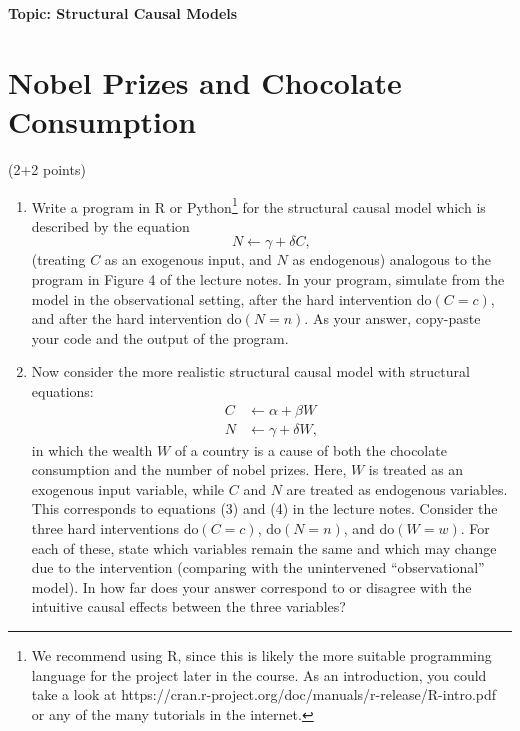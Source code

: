 

\flushleft\textbf{Topic: Structural Causal Models}


\section{Nobel Prizes and Chocolate Consumption}
 (2+2 points)
 \begin{enumerate}
   \item 
     Write a program in R or Python\footnote{We recommend using R, since this is likely the more suitable programming language for the project later in the course. As an introduction, you could take a look at https://cran.r-project.org/doc/manuals/r-release/R-intro.pdf or any of the many tutorials in the internet.} for the structural causal model which is described by the equation
\begin{equation*}
  N \leftarrow \gamma + \delta C,
  \label{eq:chocolate_causes_nobel}
\end{equation*}
(treating $C$ as an exogenous input, and $N$ as endogenous)
analogous to the program in Figure 4 of the lecture notes.
In your program, simulate from the model in the observational setting, after the hard intervention
do$(C = c)$, and after the hard intervention do$(N = n)$.
As your answer, copy-paste your code and the output of the program.
   \item Now consider the more realistic structural causal model with structural equations:
     \begin{align*}
       C & \leftarrow \alpha + \beta W \\
       N & \leftarrow \gamma + \delta W,
       \label{eq:more_realistic_model}
     \end{align*}
     in which the wealth $W$ of a country is a cause of both the chocolate consumption and the number of nobel prizes.
     Here, $W$ is treated as an exogenous input variable, while $C$ and $N$ are treated as endogenous variables.
     This corresponds to equations (3) and (4) in the lecture notes. 
     Consider the three hard interventions do$(C = c)$, do$(N = n)$, and do$(W = w)$. For each of these, state which variables remain the same and which may change due to the intervention (comparing with the unintervened ``observational'' model). In how far does your answer correspond to or disagree with the intuitive causal effects between the three variables?
   \end{enumerate}

